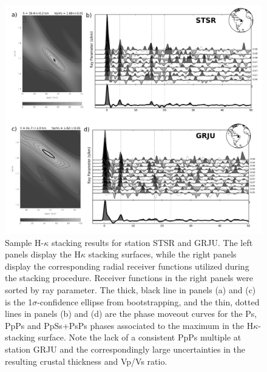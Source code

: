\documentclass[manuscript,11pt]{geophysics}
\begin{document}
\begin{figure}[!ht]
\begin{center}
\includegraphics[width=\textwidth]{Fig/mosaico_GRJU_STSR.png}
\caption{Sample H-$\kappa$ stacking results for station STSR and GRJU. The left panels display the H$\kappa$ stacking surfaces, while the right panels display the corresponding radial receiver functions utilized during the stacking procedure. Receiver functions in the right panels were sorted by ray parameter. The thick, black line in panels (a) and (c) is the 1$\sigma$-confidence ellipse from bootstrapping, and the thin, dotted lines in panels (b) and (d) are the phase moveout curves for the Ps, PpPs and PpSs+PsPs phases associated to the maximum in the H$\kappa$-stacking surface. Note the lack of a consistent PpPs multiple at station GRJU and the correspondingly large uncertainties in the resulting crustal thickness and Vp/Vs ratio.
}
\label{moisaic_FR}
\end{center}
\end{figure}
\end{document}
